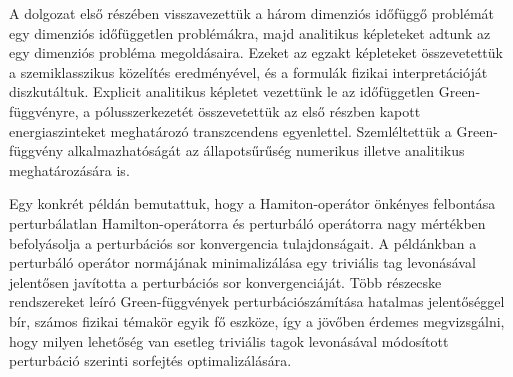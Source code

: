 A dolgozat első részében visszavezettük a három dimenziós időfüggő problémát egy dimenziós időfüggetlen problémákra, majd analitikus képleteket adtunk az egy dimenziós probléma megoldásaira. Ezeket az egzakt képleteket összevetettük a szemiklasszikus közelítés eredményével, és a formulák fizikai interpretációját diszkutáltuk. Explicit analitikus képletet vezettünk le az időfüggetlen Green-függvényre, a pólusszerkezetét összevetettük az első részben kapott energiaszinteket meghatározó transzcendens egyenlettel. Szemléltettük a Green-függvény alkalmazhatóságát az állapotsűrűség numerikus illetve analitikus meghatározására is.

Egy konkrét példán bemutattuk, hogy a Hamiton-operátor önkényes felbontása perturbálatlan Hamilton-operátorra és perturbáló operátorra nagy mértékben befolyásolja a perturbációs sor konvergencia tulajdonságait. A példánkban a perturbáló operátor normájának minimalizálása egy triviális tag levonásával jelentősen javította a perturbációs sor konvergenciáját. Több részecske rendszereket leíró Green-függvények perturbációszámítása hatalmas jelentőséggel bír, számos fizikai témakör egyik fő eszköze, így a jövőben érdemes megvizsgálni, hogy milyen lehetőség van esetleg triviális tagok levonásával módosított perturbáció szerinti sorfejtés optimalizálására.